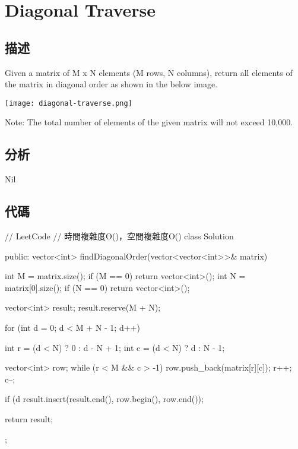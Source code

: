 \section{Diagonal Traverse}
\label{sec:diagonal-traverse}

\subsection{描述}
Given a matrix of M x N elements (M rows, N columns), return all elements of the matrix in diagonal order as shown in the below image.

\begin{center}
\texttt{[image: diagonal-traverse.png]}\\
\label{fig:diagonal-traverse}
\end{center}

Note:
The total number of elements of the given matrix will not exceed 10,000.


\subsection{分析}
Nil

\subsection{代碼}
\begin{Code}
// LeetCode
// 時間複雜度O()，空間複雜度O()
class Solution {
public:
    vector<int> findDiagonalOrder(vector<vector<int>>& matrix) {
        int M = matrix.size();
        if (M == 0) return vector<int>();
        int N = matrix[0].size();
        if (N == 0) return vector<int>();

        vector<int> result; result.reserve(M + N);

        for (int d = 0; d < M + N - 1; d++) {
            int r = (d < N) ? 0 : d - N + 1;
            int c = (d < N) ? d : N - 1;

            vector<int> row;
            while (r < M && c > -1)
            {
                row.push_back(matrix[r][c]);
                r++;
                c--;
            }

            if (d %
            result.insert(result.end(), row.begin(), row.end());
        }

        return result;
    }
};
\end{Code}

